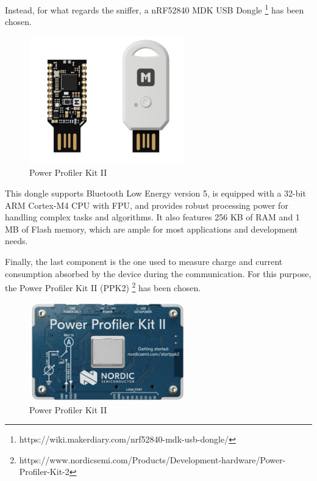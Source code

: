 \documentclass{Configuration_Files/PoliMi3i_thesis}
\begin{document}
Instead, for what regards the sniffer, a nRF52840 MDK USB Dongle \footnote{https://wiki.makerdiary.com/nrf52840-mdk-usb-dongle/} has been chosen.

\begin{figure}[h!]
    \centering
    \includegraphics[width=0.6\textwidth]{Materials/figure3}
    \caption{Power Profiler Kit II}
\end{figure}

This dongle supports Bluetooth Low Energy version 5, is equipped with a 32-bit ARM Cortex-M4 CPU with FPU, and provides robust processing power for handling complex tasks and algorithms. It also features 256 KB of RAM and 1 MB of Flash memory, which are ample for most applications and development needs.

Finally, the last component is the one used to measure charge and current consumption absorbed by the device during the communication. For this purpose, the Power Profiler Kit II (PPK2) \footnote{https://www.nordicsemi.com/Products/Development-hardware/Power-Profiler-Kit-2} has been chosen.

\begin{figure}[h!]
    \centering
    \includegraphics[width=0.6\textwidth]{Materials/figure4}
    \caption{Power Profiler Kit II}
\end{figure}
\end{document}
